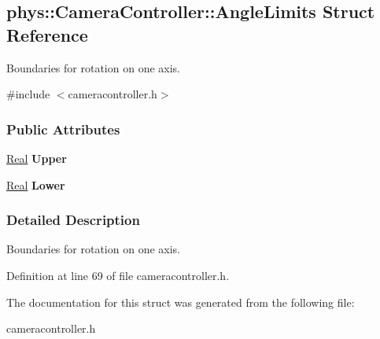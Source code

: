 \hypertarget{structphys_1_1CameraController_1_1AngleLimits}{
\subsection{phys::CameraController::AngleLimits Struct Reference}
\label{structphys_1_1CameraController_1_1AngleLimits}
}


Boundaries for rotation on one axis.  




{\ttfamily \#include $<$cameracontroller.h$>$}

\subsubsection*{Public Attributes}
\begin{DoxyCompactItemize}
\item 
\hypertarget{structphys_1_1CameraController_1_1AngleLimits_a901b87bdfec7270a2b81e31d1313e8a6}{
\hyperlink{namespacephys_af7eb897198d265b8e868f45240230d5f}{Real} {\bfseries Upper}}
\label{structphys_1_1CameraController_1_1AngleLimits_a901b87bdfec7270a2b81e31d1313e8a6}

\item 
\hypertarget{structphys_1_1CameraController_1_1AngleLimits_abd9211130ba87af89f57760936491762}{
\hyperlink{namespacephys_af7eb897198d265b8e868f45240230d5f}{Real} {\bfseries Lower}}
\label{structphys_1_1CameraController_1_1AngleLimits_abd9211130ba87af89f57760936491762}

\end{DoxyCompactItemize}


\subsubsection{Detailed Description}
Boundaries for rotation on one axis. 

Definition at line 69 of file cameracontroller.h.



The documentation for this struct was generated from the following file:\begin{DoxyCompactItemize}
\item 
cameracontroller.h\end{DoxyCompactItemize}
